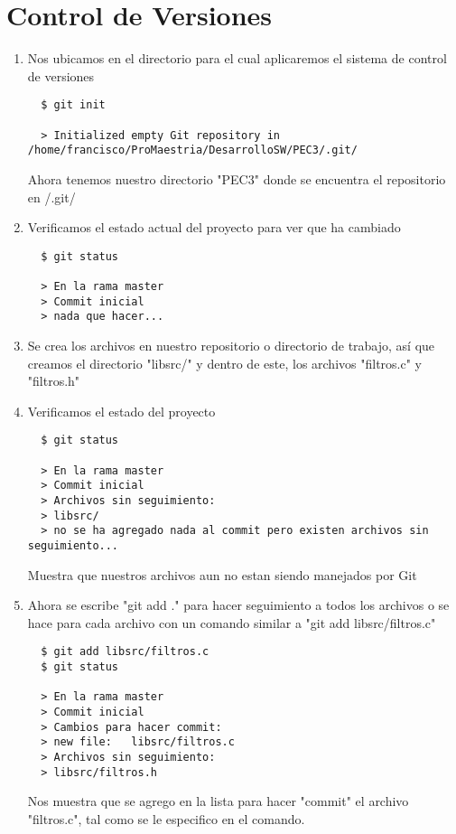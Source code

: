 \documentclass{article}
\begin{document}
  \section{Control de Versiones}
  \begin{enumerate}

  \item Nos ubicamos en el directorio para el cual aplicaremos el sistema de control de versiones
  \begin{lstlisting}
  $ git init

  > Initialized empty Git repository in /home/francisco/ProMaestria/DesarrolloSW/PEC3/.git/
  \end{lstlisting}
  Ahora tenemos nuestro directorio "PEC3" donde se encuentra el repositorio en /.git/

  \item Verificamos el estado actual del proyecto para ver que ha cambiado
  \begin{lstlisting}
  $ git status

  > En la rama master
  > Commit inicial
  > nada que hacer...
  \end{lstlisting}

  \item Se crea los archivos en nuestro repositorio o directorio de trabajo, así que creamos el directorio "libsrc/" y dentro de este, los archivos "filtros.c" y "filtros.h"

  \item Verificamos el estado del proyecto
  \begin{lstlisting}
  $ git status

  > En la rama master
  > Commit inicial
  > Archivos sin seguimiento:
  >	libsrc/
  > no se ha agregado nada al commit pero existen archivos sin seguimiento...
  \end{lstlisting}
  Muestra que nuestros archivos aun no estan siendo manejados por Git

  \item Ahora se escribe "git add ." para hacer seguimiento a todos los archivos o se hace para cada archivo con un comando similar a "git add libsrc/filtros.c"
  \begin{lstlisting}
  $ git add libsrc/filtros.c
  $ git status

  > En la rama master
  > Commit inicial
  > Cambios para hacer commit:
  >	new file:   libsrc/filtros.c
  > Archivos sin seguimiento:
  >	libsrc/filtros.h
  \end{lstlisting}
  Nos muestra que se agrego en la lista para hacer "commit" el archivo "filtros.c", tal como se le especifico en el comando.


\end{enumerate}
\end{document}
